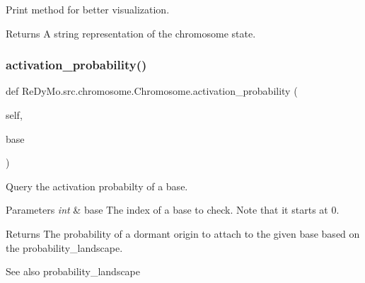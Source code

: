 Print method for better visualization. 

\begin{DoxyReturn}{Returns}
A string representation of the chromosome state. 
\end{DoxyReturn}
\mbox{\label{classReDyMo_1_1src_1_1chromosome_1_1Chromosome_ae1793cc7315be7cffaf4c1ab9385ba89}} 
\subsubsection{\texorpdfstring{activation\+\_\+probability()}{activation\_probability()}}
{\footnotesize\ttfamily def Re\+Dy\+Mo.\+src.\+chromosome.\+Chromosome.\+activation\+\_\+probability (\begin{DoxyParamCaption}\item[{}]{self,  }\item[{}]{base }\end{DoxyParamCaption})}



Query the activation probabilty of a base. 


\begin{DoxyParams}{Parameters}
{\em int} & base The index of a base to check. Note that it starts at 0. \\
\hline
\end{DoxyParams}
\begin{DoxyReturn}{Returns}
The probability of a dormant origin to attach to the given base based on the probability\+\_\+landscape. 
\end{DoxyReturn}
\begin{DoxySeeAlso}{See also}
probability\+\_\+landscape 
\end{DoxySeeAlso}
\mbox{\label{classReDyMo_1_1src_1_1chromosome_1_1Chromosome_a1dba7152914a8f8006a5ddfcaad82c31}} 
